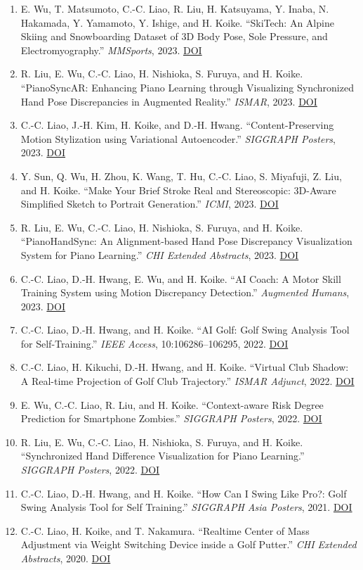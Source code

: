 \documentclass[10pt,a4paper]{article}
\newcommand{\pub}[1]{\item #1}
\begin{document}
\begin{enumerate}
  \pub{E. Wu, T. Matsumoto, C.-C. Liao, R. Liu, H. Katsuyama, Y. Inaba, N. Hakamada, Y. Yamamoto, Y. Ishige, and H. Koike. ``SkiTech: An Alpine Skiing and Snowboarding Dataset of 3D Body Pose, Sole Pressure, and Electromyography.'' \textit{MMSports}, 2023. \href{https://doi.org/10.1145/3606038.3616151}{DOI}}
  \pub{R. Liu, E. Wu, C.-C. Liao, H. Nishioka, S. Furuya, and H. Koike. ``PianoSyncAR: Enhancing Piano Learning through Visualizing Synchronized Hand Pose Discrepancies in Augmented Reality.'' \textit{ISMAR}, 2023. \href{https://doi.org/10.1109/ISMAR59233.2023.00101}{DOI}}
  \pub{C.-C. Liao, J.-H. Kim, H. Koike, and D.-H. Hwang. ``Content-Preserving Motion Stylization using Variational Autoencoder.'' \textit{SIGGRAPH Posters}, 2023. \href{https://doi.org/10.1145/3588028.3603679}{DOI}}
  \pub{Y. Sun, Q. Wu, H. Zhou, K. Wang, T. Hu, C.-C. Liao, S. Miyafuji, Z. Liu, and H. Koike. ``Make Your Brief Stroke Real and Stereoscopic: 3D-Aware Simplified Sketch to Portrait Generation.'' \textit{ICMI}, 2023. \href{https://doi.org/10.1145/3577190.3614106}{DOI}}
  \pub{R. Liu, E. Wu, C.-C. Liao, H. Nishioka, S. Furuya, and H. Koike. ``PianoHandSync: An Alignment-based Hand Pose Discrepancy Visualization System for Piano Learning.'' \textit{CHI Extended Abstracts}, 2023. \href{https://doi.org/10.1145/3544549.3585705}{DOI}}
  \pub{C.-C. Liao, D.-H. Hwang, E. Wu, and H. Koike. ``AI Coach: A Motor Skill Training System using Motion Discrepancy Detection.'' \textit{Augmented Humans}, 2023. \href{https://doi.org/10.1145/3582700.3582710}{DOI}}
  \pub{C.-C. Liao, D.-H. Hwang, and H. Koike. ``AI Golf: Golf Swing Analysis Tool for Self-Training.'' \textit{IEEE Access}, 10:106286--106295, 2022. \href{https://doi.org/10.1109/ACCESS.2022.3210261}{DOI}}
  \pub{C.-C. Liao, H. Kikuchi, D.-H. Hwang, and H. Koike. ``Virtual Club Shadow: A Real-time Projection of Golf Club Trajectory.'' \textit{ISMAR Adjunct}, 2022. \href{https://doi.org/10.1109/ISMAR-Adjunct57072.2022.00177}{DOI}}
  \pub{E. Wu, C.-C. Liao, R. Liu, and H. Koike. ``Context-aware Risk Degree Prediction for Smartphone Zombies.'' \textit{SIGGRAPH Posters}, 2022. \href{https://doi.org/10.1145/3532719.3543197}{DOI}}
  \pub{R. Liu, E. Wu, C.-C. Liao, H. Nishioka, S. Furuya, and H. Koike. ``Synchronized Hand Difference Visualization for Piano Learning.'' \textit{SIGGRAPH Posters}, 2022. \href{https://doi.org/10.1145/3532719.3543196}{DOI}}
  \pub{C.-C. Liao, D.-H. Hwang, and H. Koike. ``How Can I Swing Like Pro?: Golf Swing Analysis Tool for Self Training.'' \textit{SIGGRAPH Asia Posters}, 2021. \href{https://doi.org/10.1145/3476124.3488645}{DOI}}
  \pub{C.-C. Liao, H. Koike, and T. Nakamura. ``Realtime Center of Mass Adjustment via Weight Switching Device inside a Golf Putter.'' \textit{CHI Extended Abstracts}, 2020. \href{https://doi.org/10.1145/3334480.3383030}{DOI}}
\end{enumerate}
\end{document}
